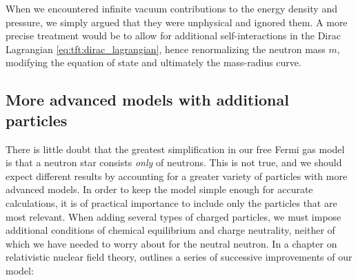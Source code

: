 When we encountered infinite vacuum contributions to the energy density and pressure, we simply argued that they were unphysical and ignored them.
A more precise treatment would be to allow for additional self-interactions in the Dirac Lagrangian \eqref{eq:tft:dirac_lagrangian}, hence renormalizing the neutron mass $m$, modifying the equation of state and ultimately the mass-radius curve.

\subsection*{More advanced models with additional particles}

There is little doubt that the greatest simplification in our free Fermi gas model is that a neutron star consists \emph{only} of neutrons.
This is not true, and we should expect different results by accounting for a greater variety of particles with more advanced models.
In order to keep the model simple enough for accurate calculations, it is of practical importance to include only the particles that are most relevant.
When adding several types of charged particles, we must impose additional conditions of chemical equilibrium and charge neutrality, neither of which we have needed to worry about for the neutral neutron.
In a chapter on relativistic nuclear field theory, \cite[chapter 4]{ref:glendenning} outlines a series of successive improvements of our model:

